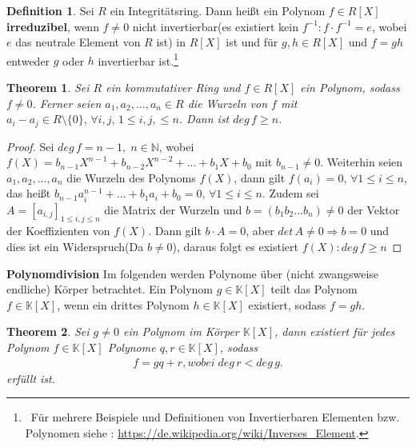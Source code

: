 \documentclass[12pt,oneside]{article}
\newtheorem{theorem}{Theorem}[section]
\theoremstyle{remark}
\theoremstyle{definition}
\newtheorem{definition}{Definition}[section]
\begin{document}
\smallskip

\begin{definition}
Sei $R$ ein Integritätsring. Dann heißt ein Polynom  $f\in R[X]$ \textbf{irreduzibel}, wenn  $f \neq 0$  nicht invertierbar(es existiert kein $f^{-1} : f \cdot f^{-1} = e$, wobei $e$ das neutrale Element von $R$ ist) in $R[X]$ ist und für $g,h\in R[X]$ und $f=gh$ entweder $g$ oder $h$ invertierbar ist.\footnote{$\, $ Für mehrere Beispiele und Definitionen von Invertierbaren Elementen bzw. Polynomen siehe : \url{https://de.wikipedia.org/wiki/Inverses_Element}.} 
\end{definition}

\smallskip

\begin{theorem}\label{number_of_roots}
Sei $R$ ein kommutativer Ring und $f \in R[X]$ ein Polynom, sodass $f \neq 0$. Ferner seien $a_1, a_2,...,a_n \in R$ die Wurzeln von $f$ mit $a_i - a_j \in R\setminus\{0\} , \, \forall i,j, \, 1 \leq i,j, \leq n$. Dann ist $deg \, f \geq n$.
\end{theorem}

\begin{proof}
Sei $deg \, f = n - 1, \; n \in \mathbb{N}$, wobei $f(X) = b_{n-1}X^{n-1} + b_{n-2}X^{n-2} + ... + b_1 X + b_0$ mit $b_{n-1} \neq 0$. Weiterhin seien $a_1,a_2,...,a_{n}$ die Wurzeln des Polynoms $f(X)$, dann gilt $f(a_i) = 0, \, \forall 1 \leq i \leq n$, das heißt $b_{n-1} a_i^{n-1} +...+ b_1 a_i + b_0 = 0, \, \forall 1 \leq i \leq n$. \newline\newline Zudem sei $A = [a_{i,j}]_{1 \leq i,j \leq n}$ die Matrix der Wurzeln und $b = (b_1 b_2 ...b_{n}) \neq 0$ der Vektor der Koeffizienten von $f(X)$. Dann gilt $b \cdot A = 0$, aber $det \, A \neq 0 \Rightarrow  b = 0$ und dies ist ein Widerspruch(Da $b \neq 0$), daraus folgt es existiert $f(X) : deg \, f \geq n$  
\end{proof}

\textbf{Polynomdivision}\newline
Im folgenden werden Polynome über (nicht zwangsweise endliche) Körper betrachtet. Ein Polynom $g \in \mathbb{K}[X]$ teilt das Polynom $f \in \mathbb{K}[X]$, wenn ein drittes Polynom $h \in \mathbb{K}[X]$ existiert, sodass $f = gh$.

\begin{theorem}\label{poly_div}
Sei $g \neq 0 $ ein Polynom im Körper $\mathbb{K}[X]$, dann existiert für jedes Polynom $f \in \mathbb{K}[X]$ Polynome $q,r \in \mathbb{K}[X]$, sodass
\begin{align*}
    f = gq + r, wobei \; deg \,  r  < deg \,  g.
\end{align*}
erfüllt ist. 
\end{theorem}
\end{document}
